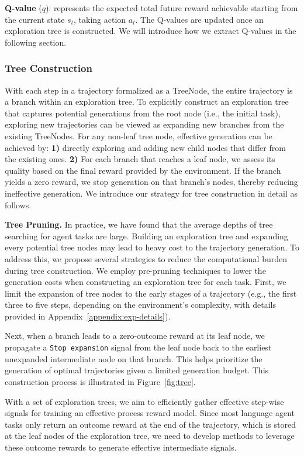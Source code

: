 \textbf{Q-value} ($q$): represents the expected total future reward achievable starting from the current state $s_t$, taking action $a_t$. The Q-values are updated once an exploration tree is constructed. We will introduce how we extract Q-values in the following section.

\subsubsection{Tree Construction}
With each step in a trajectory formalized as a TreeNode, the entire trajectory is a branch within an exploration tree. To explicitly construct an exploration tree that captures potential generations from the root node (i.e., the initial task), exploring new trajectories can be viewed as expanding new branches from the existing TreeNodes. 
 For any non-leaf tree node, effective generation can be achieved by:
 \textbf{1)} directly exploring and adding new child nodes that differ from the existing ones. \textbf{2)} For each branch that reaches a leaf node, we assess its quality based on the final reward provided by the environment. If the branch yields a zero reward, we stop generation on that branch’s nodes, thereby reducing ineffective generation.
We introduce our strategy for tree construction in detail as follows.

\textbf{Tree Pruning.} In practice, we have found that the average depths of tree searching for agent tasks are large. Building an exploration tree and expanding every potential tree nodes may lead to heavy cost to the trajectory generation. To address this, we propose several strategies to reduce the computational burden during tree construction.
We employ pre-pruning techniques to lower the generation costs when constructing an exploration tree for each task. First, we limit the expansion of tree nodes to the early stages of a trajectory (e.g., the first three to five steps, depending on the environment's complexity, with details provided in Appendix~\ref{appendix:exp-details}). 

Next, when a branch leads to a zero-outcome reward at its leaf node, we propagate a \texttt{Stop expansion} signal from the leaf node back to the earliest unexpanded intermediate node on that branch. This helps prioritize the generation of optimal trajectories given a limited generation budget. This construction process is illustrated in Figure~\ref{fig:tree}.

With a set of exploration trees, we aim to efficiently gather effective step-wise signals for training an effective process reward model. Since most language agent tasks only return an outcome reward at the end of the trajectory, which is stored at the leaf nodes of the exploration tree, we need to develop methods to leverage these outcome rewards to generate effective intermediate signals. 

